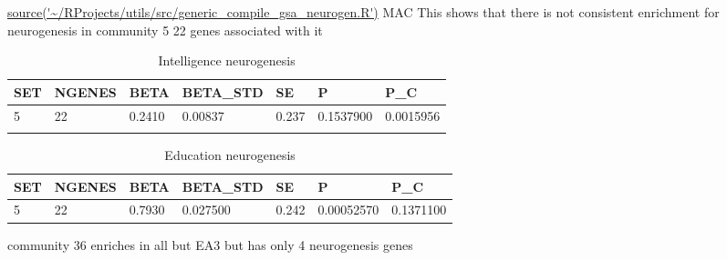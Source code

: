 \url{source('~/RProjects/utils/src/generic_compile_gsa_neurogen.R')} MAC
This shows that there is not consistent enrichment for neurogenesis in community 5 22 genes associated with it 
\begin{table}[]
    \centering
    \begin{tabular}{lllllll}
        SET& NGENES&    BETA &BETA\_STD  &  SE      &   P  & P\_C\\
        \hline
  5  &   22&  0.2410&  0.00837& 0.237& 0.1537900& 0.0015956\\   
         & 
    \end{tabular}
    \caption{Intelligence neurogenesis}
    \label{tab:Intelligence neurogenesis}
\end{table}

\begin{table}[]
    \centering
    \begin{tabular}{lllllll}
        SET& NGENES&    BETA &BETA\_STD  &  SE      &   P  & P\_C\\
        \hline
  5   &  22&  0.7930&  0.027500& 0.242& 0.00052570 &0.1371100\\

 \end{tabular}
    \caption{Education neurogenesis}
    \label{tab:Education neurogenesis}
\end{table}

community 36 enriches in all but EA3 but has only 4 neurogenesis genes 




